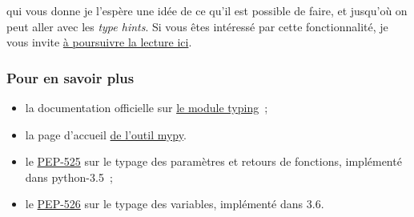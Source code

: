     qui vous donne je l'espère une idée de ce qu'il est possible de faire,
et jusqu'où on peut aller avec les \emph{type hints}. Si vous êtes
intéressé par cette fonctionnalité, je vous invite
\href{https://docs.python.org/3/library/typing.html\#user-defined-generic-types}{à
poursuivre la lecture ici}.

    \hypertarget{pour-en-savoir-plus}{%
\subsubsection{Pour en savoir plus}\label{pour-en-savoir-plus}}

\begin{itemize}
\item
  la documentation officielle sur
  \href{https://docs.python.org/3/library/typing.html}{le module
  typing}~;
\item
  la page d'accueil \href{http://mypy-lang.org/}{de l'outil mypy}.
\item
  le \href{https://www.python.org/dev/peps/pep-0484/}{PEP-525} sur le
  typage des paramètres et retours de fonctions, implémenté dans
  python-3.5~;
\item
  le \href{https://www.python.org/dev/peps/pep-0526/}{PEP-526} sur le
  typage des variables, implémenté dans 3.6.
\end{itemize}